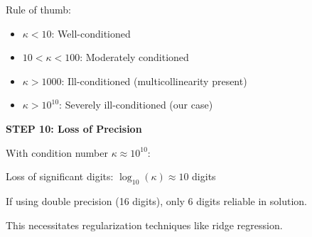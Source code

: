 \documentclass[12pt]{article}
\begin{document}
\begin{solution}
Rule of thumb:
\begin{itemize}
\item $\kappa < 10$: Well-conditioned
\item $10 < \kappa < 100$: Moderately conditioned
\item $\kappa > 1000$: Ill-conditioned (multicollinearity present)
\item $\kappa > 10^{10}$: Severely ill-conditioned (our case)
\end{itemize}

\textbf{STEP 10: Loss of Precision}

With condition number $\kappa \approx 10^{10}$:

Loss of significant digits: $\log_{10}(\kappa) \approx 10$ digits

If using double precision (16 digits), only 6 digits reliable in solution.

This necessitates regularization techniques like ridge regression.

\end{solution}
\end{document}
